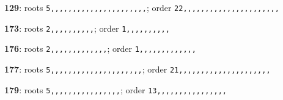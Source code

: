 \noindent \textbf{129}: roots \texttt{5,,,,,,,,,,,,,,,,,,,,,,}; order \texttt{22,,,,,,,,,,,,,,,,,,,,,,}\par
\noindent \textbf{173}: roots \texttt{2,,,,,,,,,,}; order \texttt{1,,,,,,,,,,}\par
\noindent \textbf{176}: roots \texttt{2,,,,,,,,,,,,,}; order \texttt{1,,,,,,,,,,,,,}\par
\noindent \textbf{177}: roots \texttt{5,,,,,,,,,,,,,,,,,,,,,}; order \texttt{21,,,,,,,,,,,,,,,,,,,,,}\par
\noindent \textbf{179}: roots \texttt{5,,,,,,,,,,,,,,,,}; order \texttt{13,,,,,,,,,,,,,,,,}\par
